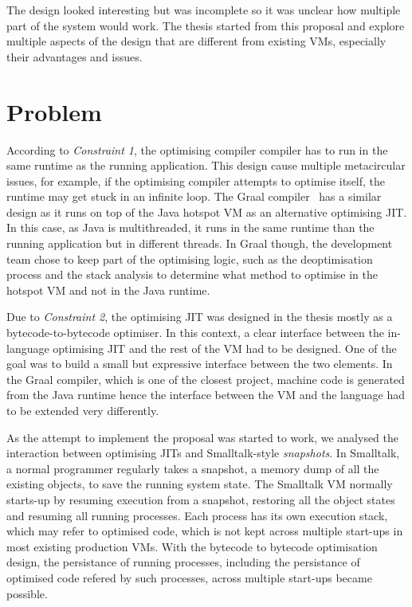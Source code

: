 \documentclass[a4paper,12pt,twoside]{../includes/ThesisStyle}
\begin{document}
The design looked interesting but was incomplete so it was unclear how multiple part of the system would work. The thesis started from this proposal and explore multiple aspects of the design that are different from existing VMs, especially their advantages and issues.

\section{Problem}

According to \emph{Constraint 1}, the optimising compiler compiler has to run in the same runtime as the running application. This design cause multiple metacircular issues, for example, if the optimising compiler attempts to optimise itself, the runtime may get stuck in an infinite loop. The Graal compiler~\cite{Dubo13c} has a similar design as it runs on top of the Java hotspot VM as an alternative optimising JIT. In this case, as Java is multithreaded, it runs in the same runtime than the running application but in different threads. In Graal though, the development team chose to keep part of the optimising logic, such as the deoptimisation process and the stack analysis to determine what method to optimise in the hotspot VM and not in the Java runtime. 

Due to \emph{Constraint 2}, the optimising JIT was designed in the thesis mostly as a bytecode-to-bytecode optimiser. In this context, a clear interface between the in-language optimising JIT and the rest of the VM had to be designed. One of the goal was to build a small but expressive interface between the two elements. In the Graal compiler, which is one of the closest project, machine code is generated from the Java runtime hence the interface between the VM and the language had to be extended very differently.

As the attempt to implement the proposal was started to work, we analysed the interaction between optimising JITs and Smalltalk-style \emph{snapshots}. In Smalltalk, a normal programmer regularly takes a snapshot, a memory dump of all the existing objects, to save the running system state. The Smalltalk VM normally starts-up by resuming execution from a snapshot, restoring all the object states and resuming all running processes. Each process has its own execution stack, which may refer to optimised code, which is not kept across multiple start-ups in most existing production VMs. With the bytecode to bytecode optimisation design, the persistance of running processes, including the persistance of optimised code refered by such processes, across multiple start-ups became possible.
\end{document}
